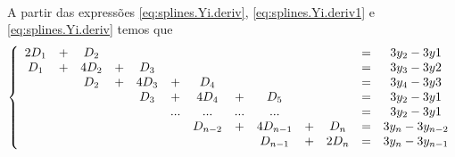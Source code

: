 \documentclass[a4paper,11pt]{article}
\begin{document}
\paragraph{}A partir das expressões \ref{eq:splines.Yi.deriv},
\ref{eq:splines.Yi.deriv1} e \ref{eq:splines.Yi.deriv} temos que 
\begin{equation}
\left\{
\begin{array}{*{13}{c}}
2D_1 & + & D_2 &\multicolumn{8}{c}{\ }& $=$ & 3y_2 - 3y1
\\
D_1 & + & 4 D_2 & + & D_3 &\multicolumn{6}{c}{\ }& $=$ & 3y_3 - 3y2
\\
\multicolumn{2}{c}{\ } & D_2 & + & 4 D_3 & + & D_4 &\multicolumn{4}{c}{\ }& $=$ & 3y_4 - 3y3
\\
\multicolumn{4}{c}{\ }& D_3 & + & 4 D_4 & + & D_5 &\multicolumn{2}{c}{\ }& $=$ & 3y_2 - 3y1
\\
\multicolumn{5}{c}{\ }& ... & ... & ... & ... & \multicolumn{2}{c}{\ }& $=$ & 3y_2 - 3y1
\\
\multicolumn{6}{c}{\ }& D_{n-2} & + & 4 D_{n-1} & + & D_n & $=$ & 3y_{n} - 3y_{n-2}
\\
\multicolumn{8}{c}{\ } & D_{n-1} & + & 2D_n & $=$ & 3y_n - 3y_{n-1}
\\
\end{array}
\right.
\end{equation}

\end{document}
